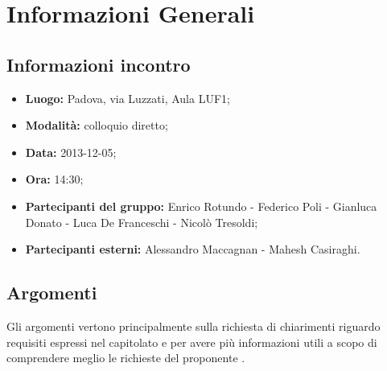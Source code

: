 \section{Informazioni Generali}
	\subsection{Informazioni incontro}
	\begin{itemize}
		\item {\bfseries Luogo:} Padova, via Luzzati, Aula LUF1;
		\item {\bfseries Modalità:} colloquio diretto;
		\item {\bfseries Data:} 2013-12-05;
		\item {\bfseries Ora:} 14:30;
		\item {\bfseries Partecipanti del gruppo:} Enrico Rotundo - Federico Poli - Gianluca Donato - Luca De Franceschi - Nicolò Tresoldi;
		\item {\bfseries Partecipanti esterni:} Alessandro Maccagnan - Mahesh Casiraghi.
	\end{itemize}
	
	\subsection{Argomenti}
		Gli argomenti vertono principalmente sulla richiesta di chiarimenti riguardo requisiti espressi nel capitolato e per avere più informazioni utili a scopo di comprendere meglio le richieste del proponente \Proponente{}.